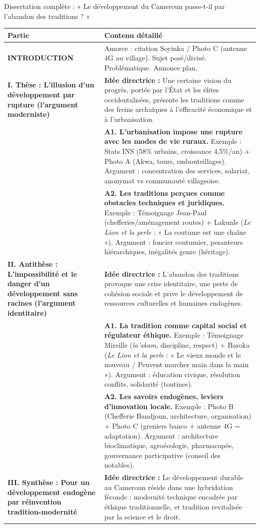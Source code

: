 \documentclass[11pt]{article}
\newcommand{\cle}[1]{{\popxbold\color{popdark}#1}}
\begin{document}
\begin{exoresolu}{Dissertation complète : « Le développement du Cameroun passe-t-il par l'abandon des traditions ? »}
\begin{center}
\begin{tabularx}{\linewidth}{|l|X|}\hline
\textbf{Partie} & \textbf{Contenu détaillé} \\ \hline
\textbf{INTRODUCTION} & Amorce : citation Soyinka / Photo C (antenne 4G au village). Sujet posé/divisé. Problématique. Annonce plan. \\ \hline
\textbf{I. Thèse : L'illusion d'un développement par rupture (l'argument moderniste)} & \textbf{Idée directrice :} Une certaine vision du progrès, portée par l'État et les élites occidentalisées, présente les traditions comme des freins archaïques à l'efficacité économique et à l'urbanisation. \\
& \textbf{A1. L'urbanisation impose une rupture avec les modes de vie ruraux.} Exemple : Stats INS (58\% urbains, croissance 4,5\%/an) + Photo A (Akwa, tours, embouteillages). Argument : concentration des services, salariat, anonymat vs communauté villageoise. \\
& \textbf{A2. Les traditions perçues comme obstacles techniques et juridiques.} Exemple : Témoignage Jean-Paul (chefferies/aménagement routes) + Lakunle (\emph{Le Lion et la perle} : « La coutume est une chaîne »). Argument : foncier coutumier, pesanteurs hiérarchiques, inégalités genre (héritage). \\ \hline
\textbf{II. Antithèse : L'impossibilité et le danger d'un développement sans racines (l'argument identitaire)} & \textbf{Idée directrice :} L'abandon des traditions provoque une crise identitaire, une perte de cohésion sociale et prive le développement de ressources culturelles et humaines endogènes. \\
& \textbf{A1. La tradition comme capital social et régulateur éthique.} Exemple : Témoignage Mireille (\emph{la'akam}, discipline, respect) + Baroka (\emph{Le Lion et la perle} : « Le vieux monde et le nouveau / Peuvent marcher main dans la main »). Argument : éducation civique, résolution conflits, solidarité (tontines). \\
& \textbf{A2. Les savoirs endogènes, leviers d'innovation locale.} Exemple : Photo B (Chefferie Bandjoun, architecture, organisation) + Photo C (greniers banco + antenne 4G = adaptation). Argument : architecture bioclimatique, agroécologie, pharmacopée, gouvernance participative (conseil des notables). \\ \hline
\textbf{III. Synthèse : Pour un développement endogène par réinvention tradition-modernité} & \textbf{Idée directrice :} Le développement durable au Cameroun réside dans une \cle{hybridation féconde} : modernité technique encadrée par éthique traditionnelle, et tradition revitalisée par la science et le droit. \\

\end{tabularx}
\end{center}
\end{exoresolu}
\end{document}
